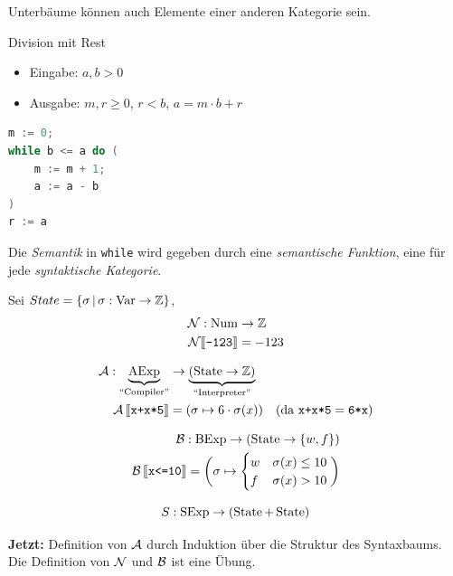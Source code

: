 \begin{remark}
    Unterbäume können auch Elemente einer anderen Kategorie sein.
\end{remark}

\begin{example}
    Division mit Rest
    \begin{itemize}
        \item Eingabe: $a, b > 0$
        \item Ausgabe: $m ,r \geq 0$, $r < b$, $a = m \cdot b + r$
    \end{itemize}
\end{example}

\begin{lstlisting}[language=C, caption=Division mit Rest]
m := 0;
while b <= a do (
    m := m + 1;
    a := a - b
)
r := a
\end{lstlisting}

Die \emph{Semantik} in \texttt{while} wird gegeben durch eine \emph{semantische Funktion}, eine für jede \emph{syntaktische Kategorie}.

Sei $State = \{ \sigma \,\vert\, \sigma: \operatorname{Var} \to \mathbb{Z} \}$, \zb
\begin{align*}
    \mathcal{N} : \operatorname{Num} & \to \mathbb{Z} \\
    \mathcal{N}\mathrm{[}\kern-.14em\mathrm{[}\texttt{-123}\mathrm{]}\kern-.14em\mathrm{]} & = -123
\end{align*}

\begin{align*}
    \operatorname{\mathcal{A}}: \underbrace{\operatorname{AExp}}_{\text{``Compiler''}} & \to \underbrace{(\operatorname{State} \to \mathbb{Z})}_{\text{``Interpreter''}} \\
    \operatorname{\mathcal{A}}\mathrm{[}\kern-.14em\mathrm{[}\texttt{x+x*5}\mathrm{]}\kern-.14em\mathrm{]} & = (\sigma \mapsto 6 \cdot \sigma(x)) \quad (\text{da }\texttt{x+x*5} = \texttt{6*x})
\end{align*}

\begin{align*}
    \operatorname{\mathcal{B}} : \operatorname{BExp} \to (\operatorname{State} \to \{ w, f \}) \\
    \operatorname{\mathcal{B}}\mathrm{[}\kern-.14em\mathrm{[}\texttt{x<=10}\mathrm{]}\kern-.14em\mathrm{]} = \bigg( \sigma \mapsto \begin{cases}
        w & \sigma(x) \leq 10 \\
        f & \sigma(x) > 10
    \end{cases} \bigg)
\end{align*}

\[
S: \operatorname{SExp} \to (\operatorname{State} + \operatorname{State})
\]

\textbf{Jetzt:} Definition von $\operatorname{\mathcal{A}}$ durch Induktion über die Struktur des Syntaxbaums. Die Definition von $\operatorname{\mathcal{N}}$ und $\operatorname{\mathcal{B}}$ ist eine Übung.

